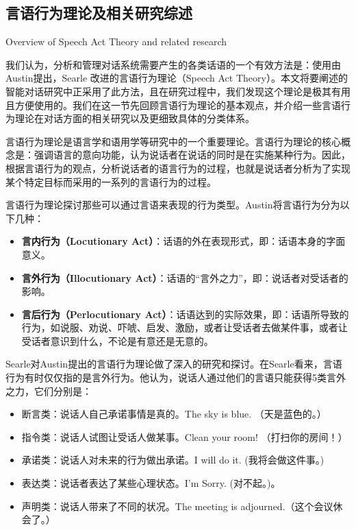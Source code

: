 \subsection{言语行为理论及相关研究综述}{Overview of Speech Act Theory and related research}
\label{sec:speechAct}

我们认为，分析和管理对话系统需要产生的各类话语的一个有效方法是：使用由Austin\cite{Austin2005}提出，Searle\cite{Searle1969} 改进的言语行为理论（Speech Act Theory）。本文将要阐述的智能对话研究中正采用了此方法，且在研究过程中，我们发现这个理论是极其有用且方便使用的。我们在这一节先回顾言语行为理论的基本观点，并介绍一些言语行为理论在对话方面的相关研究以及更细致具体的分类体系。

言语行为理论是语言学和语用学等研究中的一个重要理论。言语行为理论的核心概念是：强调语言的意向功能，认为说话者在说话的同时是在实施某种行为。因此，根据言语行为的观点，分析说话者的语言行为的过程，也就是说话者分析为了实现某个特定目标而采用的一系列的言语行为的过程。

言语行为理论探讨那些可以通过言语来表现的行为类型。Austin\cite{Austin2005}将言语行为分为以下几种：

\begin{itemize}
\item {\bf 言内行为（Locutionary Act）}：话语的外在表现形式，即：话语本身的字面意义。
\item {\bf 言外行为（Illocutionary Act）}：话语的“言外之力”，即：说话者对受话者的影响。
\item {\bf 言后行为（Perlocutionary Act）}：话语达到的实际效果，即：话语所导致的行为，如说服、劝说、吓唬、启发、激励，或者让受话者去做某件事，或者让受话者意识到什么，不论是有意还是无意的。
\end{itemize}

Searle对Austin提出的言语行为理论做了深入的研究和探讨。在Searle\cite{Searle1969}看来，言语行为有时仅仅指的是言外行为。他认为，说话人通过他们的言语只能获得5类言外之力，它们分别是：

\begin{itemize}
\item 断言类：说话人自己承诺事情是真的。The sky is blue. （天是蓝色的。）
\item 指令类：说话人试图让受话人做某事。Clean your room! （打扫你的房间！）
\item 承诺类：说话人对未来的行为做出承诺。I will do it. (我将会做这件事。)
\item 表达类：说话者表达了某些心理状态。I’m Sorry. (对不起。)。
\item 声明类：说话人带来了不同的状况。The meeting is adjourned.（这个会议休会了。）
\end{itemize}

